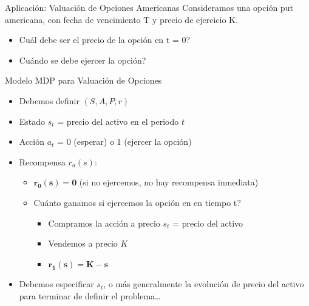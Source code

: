 \documentclass[handout]{beamer}
\begin{document}
\begin{frame}{Aplicación: Valuación de Opciones Americanas}
Consideramos una opción put americana, con fecha de vencimiento T y precio de ejercicio K. 
\begin{itemize}
\item<2-> Cuál debe ser el precio de la opción en t = 0?
\item<3-> Cuándo se debe ejercer la opción?   
\end{itemize}  
\end{frame}

\begin{frame}{Modelo MDP para Valuación de Opciones}
\begin{itemize}
\item Debemos definir $(S,A,P,r)$
\item<2-> Estado $s_t$ = precio del activo en el periodo $t$ 
\item<3-> Acción $a_t$ = 0 (esperar) o 1 (ejercer la opción) 
\item<4-> Recompensa $r_a(s)$:
\begin{itemize}
\item<5-> $\mathbf{r_0(s) = 0}$ (si no ejercemos, no hay recompensa inmediata) 
\item<6-> Cuánto ganamos si ejercemos la opción en en tiempo t?
\begin{itemize}
\item<7-> Compramos la acción a precio $s_t$ = precio del activo 
\item<8-> Vendemos a precio $K$
\item<9-> $\mathbf{r_1(s) = K-s}$
\end{itemize}
\end{itemize}
\item<10-> Debemos especificar $s_t$, o más generalmente la evolución de precio del activo     para terminar de definir el problema…
\end{itemize}
\end{frame}
\end{document}
